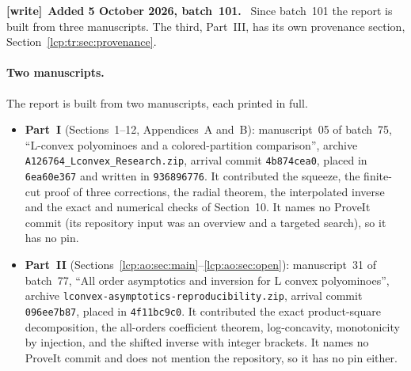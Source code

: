 \documentclass[11pt]{article}
\numberwithin{equation}{section}
\theoremstyle{definition}\newtheorem{definition}[theorem]{Definition}
\theoremstyle{remark}\newtheorem{remark}[theorem]{Remark}
\newenvironment{writenote}[1][]{\par\smallskip\begingroup\small
 \noindent\textbf{[write]}\if\relax\detokenize{#1}\relax\else~\textbf{#1.}\fi\ }%
 {\par\endgroup\smallskip}
\begin{document}
\begin{writenote}[Added 5 October 2026, batch~101]
Since batch~101 the report is built from three manuscripts. The third,
Part~III, has its own provenance section, Section~\ref{lcp:tr:sec:provenance}.
\end{writenote}

\paragraph{Two manuscripts.} The report is built from two manuscripts, each
printed in full.
\begin{itemize}[leftmargin=*,itemsep=0.15em]
\item \textbf{Part~I} (Sections~1--12, Appendices~A and~B): manuscript~05
 of batch~75, ``L-convex polyominoes and a colored-partition comparison'',
 archive \texttt{A126764\_\allowbreak Lconvex\_\allowbreak Research.zip},
 arrival commit \texttt{4b874cea0}, placed in \texttt{6ea60e367} and
 written in \texttt{936896776}. It contributed the squeeze, the finite-cut
 proof of three corrections, the radial theorem, the interpolated inverse
 and the exact and numerical checks of Section~10. It names no ProveIt
 commit (its repository input was an overview and a targeted search), so it
 has no pin.
\item \textbf{Part~II} (Sections~\ref{lcp:ao:sec:main}--\ref{lcp:ao:sec:open}):
 manuscript~31 of batch~77, ``All order asymptotics and inversion for L
 convex polyominoes'', archive
 \texttt{lconvex-\allowbreak asymptotics-\allowbreak reproducibility.zip},
 arrival commit \texttt{096ee7b87}, placed in \texttt{4f11bc9c0}. It
 contributed the exact product-square decomposition, the all-orders
 coefficient theorem, log-concavity, monotonicity by injection, and the
 shifted inverse with integer brackets. It names no ProveIt commit and does
 not mention the repository, so it has no pin either.
\end{itemize}
\end{document}
